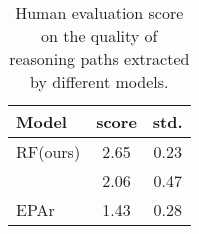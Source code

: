 \begin{table}[t]
	\centering
	\small
	\renewcommand\tabcolsep{4.0pt}
	\begin{tabular}{l|cc}
	\toprule
  \textbf{Model} &score & std.\\
  \midrule
  RF(ours) &2.65 &0.23\\
  \citet{Kundu2019} &2.06 &0.47 \\
  EPAr &1.43 &0.28 \\
  \bottomrule
	\end{tabular}
\caption{Human evaluation score on the quality of reasoning paths extracted by different models.}
\label{tab:score}
\end{table}
















